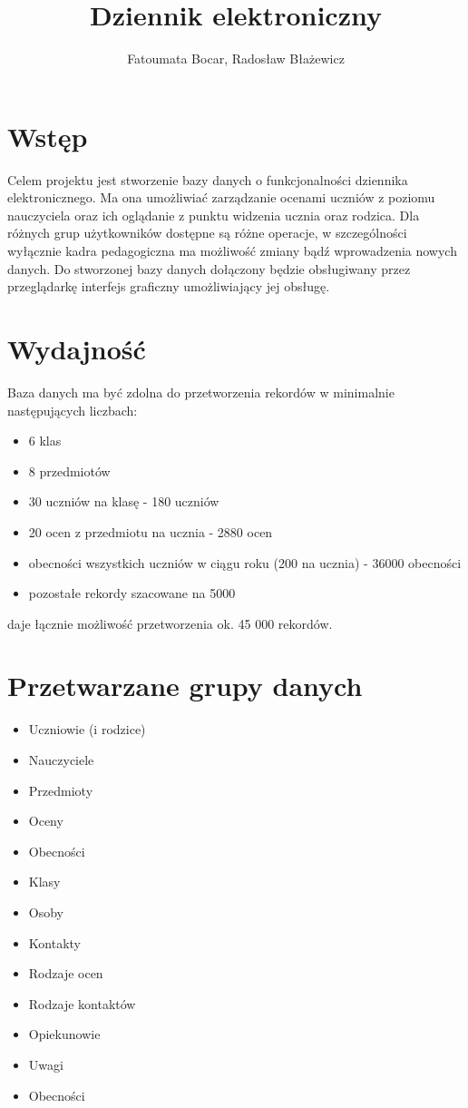 \documentclass[10pt,a4paper,notitlepage]{article}
\title{Dziennik elektroniczny}
\author{Fatoumata Bocar, Radosław Błażewicz}
\date{}
\begin{document}
\maketitle
\section{Wstęp}
Celem projektu jest stworzenie bazy danych o funkcjonalności dziennika elektronicznego. Ma ona umożliwiać zarządzanie ocenami uczniów z poziomu nauczyciela oraz ich oglądanie z punktu widzenia ucznia oraz rodzica. Dla różnych grup użytkowników dostępne są różne operacje, w szczególności wyłącznie kadra pedagogiczna ma możliwość zmiany bądź wprowadzenia nowych danych.
Do stworzonej bazy danych dołączony będzie obsługiwany przez przeglądarkę interfejs graficzny umożliwiający jej obsługę.

\section{Wydajność}
Baza danych ma być zdolna do przetworzenia rekordów w minimalnie następujących liczbach:
\begin{itemize}


\item 6 klas
\item 8 przedmiotów
\item 30 uczniów na klasę - 180 uczniów
\item 20 ocen z przedmiotu  na ucznia - 2880 ocen
\item obecności wszystkich uczniów w ciągu roku (200 na ucznia) - 36000 obecności
\item pozostałe rekordy szacowane na 5000
\end{itemize}
daje łącznie możliwość przetworzenia ok. 45 000 rekordów. 
\section{Przetwarzane grupy danych}
\begin{itemize}
	\item Uczniowie (i rodzice)
	\item Nauczyciele
	\item Przedmioty
	\item Oceny
	\item Obecności
	\item Klasy
	\item Osoby
	\item Kontakty
	\item Rodzaje ocen
	\item Rodzaje kontaktów
	\item Opiekunowie
	\item Uwagi
	\item Obecności

\end{itemize}
\end{document}
